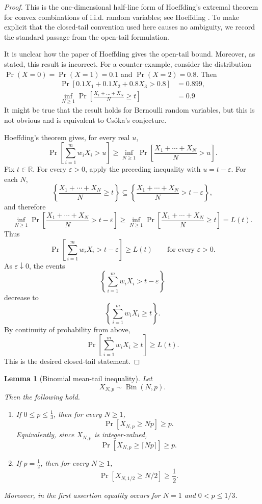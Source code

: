 \documentclass[12pt]{article}
\theoremstyle{definition}
\theoremstyle{plain}
\newtheorem{lemma}[definition]{Lemma}
\theoremstyle{remark}
\newcommand{\review}[1]{\begin{reviewbox}#1\end{reviewbox}}
\begin{document}
\begin{proof}
This is the one-dimensional half-line form of Hoeffding's extremal theorem for convex combinations of i.i.d. random variables; see Hoeffding \cite{Hoeffding1955}. To make explicit that the closed-tail convention used here causes no ambiguity, we record the standard passage from the open-tail formulation.

\review{It is unclear how the paper of Hoeffding gives the open-tail bound. Moreover, as stated, this result is incorrect. For a counter-example, consider the distribution $\Pr(X = 0) = \Pr(X = 1) = 0.1$ and $\Pr(X = 2) = 0.8$. Then 
\begin{align*}
    \Pr \left [0.1 X_1 + 0.1 X_2 + 0.8 X_3 > 0.8 \right ] &= 0.899, \\
    \inf_{N \geq 1} \Pr \left [ \frac{X_1 + \ldots + X_N}{N} \geq t\right ] & = 0.9
\end{align*}
It might be true that the result holds for Bernoulli random variables, but this is not obvious and is equivalent to Csóka's conjecture. 
}
Hoeffding's theorem gives, for every real \(u\),
\[
\Pr\!\left[\sum_{i=1}^{m}w_iX_i>u\right]
\ge
\inf_{N\ge1}
\Pr\!\left[\frac{X_1+\cdots+X_N}{N}>u\right].
\]
Fix \(t\in\mathbb R\). For every \(\varepsilon>0\), apply the preceding inequality with \(u=t-\varepsilon\). For each \(N\),
\[
\left\{\frac{X_1+\cdots+X_N}{N}\ge t\right\}
\subseteq
\left\{\frac{X_1+\cdots+X_N}{N}>t-\varepsilon\right\},
\]
and therefore
\[
\inf_{N\ge1}
\Pr\!\left[\frac{X_1+\cdots+X_N}{N}>t-\varepsilon\right]
\ge
\inf_{N\ge1}
\Pr\!\left[\frac{X_1+\cdots+X_N}{N}\ge t\right]
=L(t).
\]
Thus
\[
\Pr\!\left[\sum_{i=1}^{m}w_iX_i>t-\varepsilon\right]\ge L(t)
\qquad\text{for every }\varepsilon>0.
\]
As \(\varepsilon\downarrow0\), the events
\[
\left\{\sum_{i=1}^{m}w_iX_i>t-\varepsilon\right\}
\]
decrease to
\[
\left\{\sum_{i=1}^{m}w_iX_i\ge t\right\}.
\]
By continuity of probability from above,
\[
\Pr\!\left[\sum_{i=1}^{m}w_iX_i\ge t\right]\ge L(t).
\]
This is the desired closed-tail statement.
\end{proof}

\begin{lemma}[Binomial mean-tail inequality]\label{lem:binomial}
Let
\[
X_{N,p}\sim\operatorname{Bin}(N,p).
\]
Then the following hold.

\begin{enumerate}
\item If \(0\le p\le \frac13\), then for every \(N\ge1\),
\[
\Pr[X_{N,p}\ge Np]\ge p.
\]
Equivalently, since \(X_{N,p}\) is integer-valued,
\[
\Pr[X_{N,p}\ge \lceil Np\rceil]\ge p.
\]

\item If \(p=\frac12\), then for every \(N\ge1\),
\[
\Pr[X_{N,1/2}\ge N/2]\ge \frac12.
\]
\end{enumerate}
Moreover, in the first assertion equality occurs for \(N=1\) and \(0<p\le1/3\).
\end{lemma}
\end{document}
